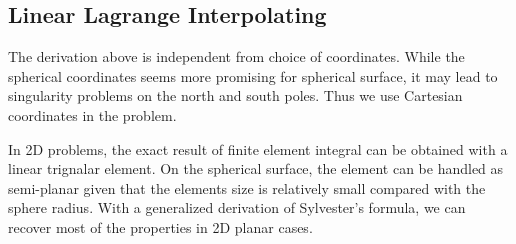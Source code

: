 \documentclass[a4paper]{article}
\begin{document}
\subsection{Linear Lagrange Interpolating}
The derivation above is independent from choice of coordinates. While the spherical coordinates
seems more promising for spherical surface, it may lead to singularity problems 
on the north and south poles. Thus we use Cartesian coordinates in the problem.

In 2D problems, the exact result of finite element integral can be obtained with a linear trignalar
element. On the spherical surface, the element can be handled as semi-planar given that the elements size is
relatively small compared with the sphere radius. With a generalized derivation of Sylvester’s formula,
we can recover most of the properties in 2D planar cases\cite{giraldo1997lagrange}.
\end{document}
